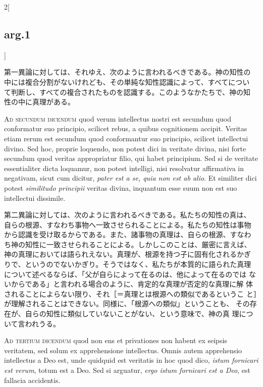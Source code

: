 \documentclass[paper=a4paper,fontsize=10pt,jafontsize=9pt,titlepage]{jlreq}
\begin{document}
\begin{paracol}{2}[\subsection{arg.1}]
\switchcolumn

第一異論に対しては、それゆえ、次のように言われるべきである。神の知性の
中には複合分割がないけれども、その単純な知性認識によって、すべてについ
て判断し、すべての複合されたものを認識する。このようなかたちで、神の知
性の中に真理がある。

\switchcolumn*[\subsection{ad.2}]


{\scshape Ad secundum dicendum} quod verum intellectus nostri est
 secundum quod conformatur suo principio, scilicet rebus, a quibus
 cognitionem accipit. Veritas etiam rerum est secundum quod
 conformantur suo principio, scilicet intellectui divino. Sed hoc,
 proprie loquendo, non potest dici in veritate divina, nisi forte
 secundum quod veritas appropriatur filio, qui habet principium. Sed
 si de veritate essentialiter dicta loquamur, non potest intelligi,
 nisi resolvatur affirmativa in negativam, sicut cum dicitur,
 {\itshape pater est a se, quia non est ab alio}. Et similiter dici
 potest {\itshape similitudo principii} veritas divina, inquantum esse
 suum non est suo intellectui dissimile.

\switchcolumn

第二異論に対しては、次のように言われるべきである。私たちの知性の真は、
自らの根源、すなわち事物へ一致させられることによる。私たちの知性は事物
から認識を受け取るからである。また、諸事物の真理は、自らの根源、すなわ
ち神の知性に一致させられることによる。しかしこのことは、厳密に言えば、
神の真理においては語られえない。真理が、根源を持つ子に固有化されるかぎ
りで、というのでないかぎり。そうではなく、私たちが本質的に語られた真理
について述べるならば、「父が自らによって在るのは、他によって在るのでは
ないからである」と言われる場合のように、肯定的な真理が否定的な真理に解
体されることによらない限り、それ［＝真理とは根源への類似であるというこ
と］が理解されることはできない。同様に、「根源への類似」ということも、
その存在が、自らの知性に類似していないことがない、という意味で、神の真
理について言われうる。

\switchcolumn*[\subsection{ad.3}]


{\scshape Ad tertium dicendum} quod non ens et privationes non habent
ex seipsis veritatem, sed solum ex apprehensione intellectus. Omnis
autem apprehensio intellectus a Deo est, unde quidquid est veritatis
in hoc quod dico, {\itshape istum fornicari est verum}, totum est a
Deo. Sed si arguatur, {\itshape ergo istum fornicari est a Deo}, est
fallacia accidentis.


\end{paracol}
\end{document}
